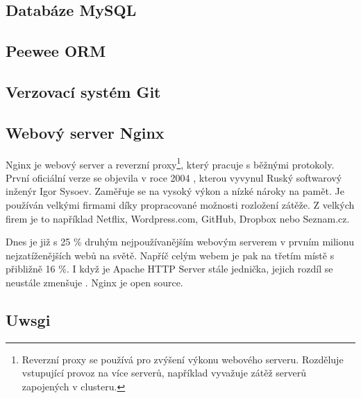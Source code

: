 
\subsection{Databáze MySQL}

\subsection{Peewee ORM}

\subsection{Verzovací systém Git}

\subsection{Webový server Nginx}

\indent

Nginx je webový server a reverzní proxy\footnote{Reverzní proxy se používá pro zvýšení výkonu webového serveru.
Rozděluje vstupující provoz na více serverů, například vyvažuje zátěž serverů zapojených v clusteru.}, který pracuje s běžnými protokoly.
První oficiální verze se objevila v roce 2004 \cite{nginx-changes}, kterou vyvynul Ruský softwarový inženýr Igor Sysoev.
Zaměřuje se na vysoký výkon a nízké nároky na pamět. Je používán velkými firmami
díky propracované možnosti rozložení zátěže. Z velkých firem je to například Netflix, Wordpress.com,
GitHub, Dropbox nebo Seznam.cz.

\medskip

Dnes je již s 25 \% druhým nejpoužívanějším webovým serverem v prvním milionu nejzatíženějších webů na světě.
Napříč celým webem je pak na třetím místě s přibližně 16 \%. I když je Apache HTTP Server stále jednička, 
jejich rozdíl se neustále zmenšuje \cite{nginx-statistic}. Nginx je open source.


\subsection{Uwsgi}


